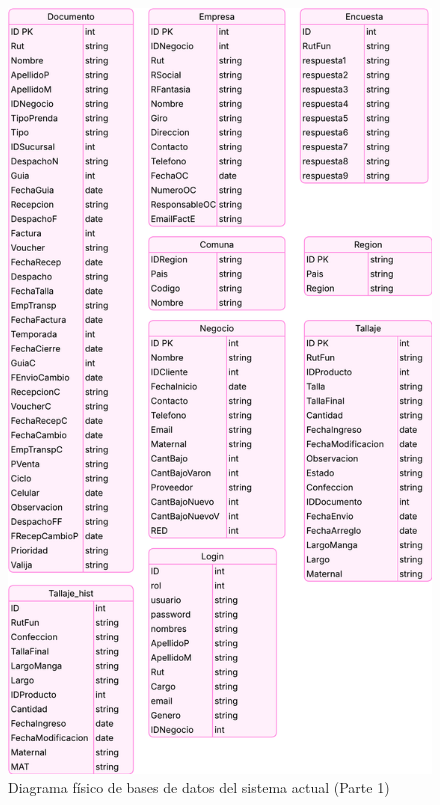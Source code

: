 \begin{figure}[htbp]
    \centering
    \includegraphics[height=0.7\textheight]{figuras/diagramas-actuales/diagrama-bdd-1}
    \caption{Diagrama físico de bases de datos del sistema actual (Parte 1)}
    \label{fig:diagrama-bdd-1-actual}
\end{figure}


